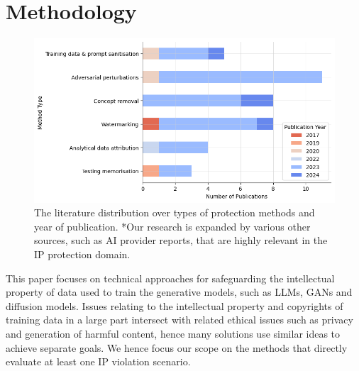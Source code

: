 \documentclass[conference]{IEEEtran}
\begin{document}


\section{Methodology}\label{sec:methodology}
\begin{figure}
    \centering
    \includegraphics[width=\linewidth]{figures/stats.png}
    \caption{The literature distribution over types of protection methods and year of publication. *Our research is expanded by various other sources, such as AI provider reports, that are highly relevant in the IP protection domain.}
    \label{fig:stats}
\end{figure}
This paper focuses on technical approaches for safeguarding the intellectual property of data used to train the generative models, such as LLMs, GANs and diffusion models. 
Issues relating to the intellectual property and copyrights of training data in a large part intersect with related ethical issues such as privacy and generation of harmful content, hence many solutions use similar ideas to achieve separate goals. We hence focus our scope on the methods that directly evaluate at least one IP violation scenario. 
\end{document}
